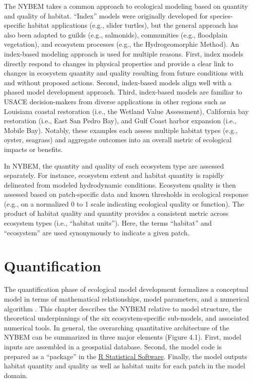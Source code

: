 \documentclass[
]{book}
\begin{document}
The NYBEM takes a common approach to ecological modeling based on quantity and quality of habitat. ``Index'' models \citep{swannack_ecological_2012} were originally developed for species-specific habitat applications (e.g., slider turtles), but the general approach has also been adapted to guilds (e.g., salmonids), communities (e.g., floodplain vegetation), and ecosystem processes (e.g., the Hydrogeomorphic Method). An index-based modeling approach is used for multiple reasons. First, index models directly respond to changes in physical properties and provide a clear link to changes in ecosystem quantity and quality resulting from future conditions with and without proposed actions. Second, index-based models align well with a phased model development approach. Third, index-based models are familiar to USACE decision-makers from diverse applications in other regions such as Louisiana coastal restoration (i.e., the Wetland Value Assessment), California bay restoration (i.e., East San Pedro Bay), and Gulf Coast harbor expansion (i.e., Mobile Bay). Notably, these examples each assess multiple habitat types (e.g., oyster, seagrass) and aggregate outcomes into an overall metric of ecological impacts or benefits.

In NYBEM, the quantity and quality of each ecosystem type are assessed separately. For instance, ecosystem extent and habitat quantity is rapidly delineated from modeled hydrodynamic conditions. Ecosystem quality is then assessed based on patch-specific data and known thresholds in ecological response (e.g., on a normalized 0 to 1 scale indicating ecological quality or function). The product of habitat quality and quantity provides a consistent metric across ecosystem types (i.e., ``habitat units''). Here, the terms ``habitat'' and ``ecosystem'' are used synonymously to indicate a given patch.

\hypertarget{quantification}{%
\chapter{Quantification}\label{quantification}}

The quantification phase of ecological model development formalizes a conceptual model in terms of mathematical relationships, model parameters, and a numerical algorithm \citep{grant_ecological_2008}. This chapter describes the NYBEM relative to model structure, the theoretical underpinnings of the six ecosystem-specific sub-models, and associated numerical tools. In general, the overarching quantitative architecture of the NYBEM can be summarized in three major elements (Figure 4.1). First, model inputs are assembled in a geospatial database. Second, the model code is prepared as a ``package'' in the \href{https://cran.r-project.org/}{R Statistical Software}. Finally, the model outputs habitat quantity and quality as well as habitat units for each patch in the model domain.
\end{document}
